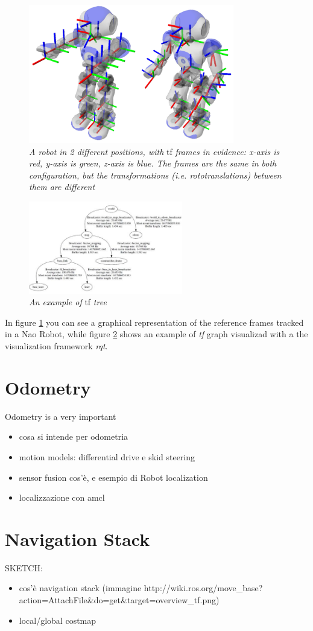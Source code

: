 \begin{figure}
	\centering
	\includegraphics[width=0.8\textwidth]{Images/background_and_tools/tf_tree.png}
	\caption{\textit{A robot in 2 different positions, with} tf \textit{frames in evidence: x-axis is red, y-axis is green, z-axis is blue. The frames are the same in both configuration, but the transformations (i.e. rototranslations) between them are different}}
	\label{fig:tfTreeRviz}
\end{figure}

\begin{figure}
	\centering
	\includegraphics[width=0.6\textwidth]{Images/background_and_tools/tfGraph.JPG}
	\caption{\textit{An example of} tf \textit{tree}}
	\label{fig:tfGraph}
\end{figure}

In figure \ref{fig:tfTreeRviz} you can see a graphical representation of the reference frames tracked in a Nao Robot, while figure \ref{fig:tfGraph} shows an example of \textit{tf} graph visualizad with a the visualization framework \textit{rqt}. 


\section{Odometry}\label{sec:odometry}
Odometry is a very important 
\begin{itemize}
	\item cosa si intende per odometria
	\item motion models: differential drive e skid steering
	\item sensor fusion cos'è, e esempio di Robot localization
	\item localizzazione con amcl
\end{itemize}

\section{Navigation Stack}\label{sec:navigationStack}
SKETCH:
\begin{itemize}
	\item cos'è navigation stack (immagine http://wiki.ros.org/move\_base?action=AttachFile\&do=get\&target=overview\_tf.png)
	\item local/global costmap
\end{itemize}